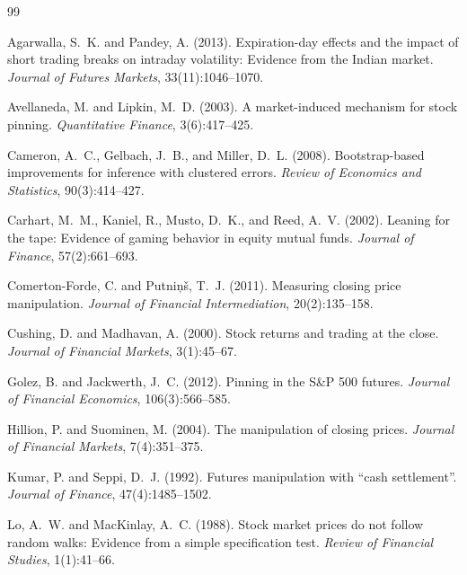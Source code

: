\begin{thebibliography}{99}
\setlength{\itemsep}{2pt}
\small

Agarwalla, S.~K. and Pandey, A. (2013).
\newblock Expiration-day effects and the impact of short trading breaks on intraday
  volatility: Evidence from the Indian market.
\newblock \emph{Journal of Futures Markets}, 33(11):1046--1070.

Avellaneda, M. and Lipkin, M.~D. (2003).
\newblock A market-induced mechanism for stock pinning.
\newblock \emph{Quantitative Finance}, 3(6):417--425.

Cameron, A.~C., Gelbach, J.~B., and Miller, D.~L. (2008).
\newblock Bootstrap-based improvements for inference with clustered errors.
\newblock \emph{Review of Economics and Statistics}, 90(3):414--427.

Carhart, M.~M., Kaniel, R., Musto, D.~K., and Reed, A.~V. (2002).
\newblock Leaning for the tape: Evidence of gaming behavior in equity mutual funds.
\newblock \emph{Journal of Finance}, 57(2):661--693.

Comerton-Forde, C. and Putni{\c{n}}{\v{s}}, T.~J. (2011).
\newblock Measuring closing price manipulation.
\newblock \emph{Journal of Financial Intermediation}, 20(2):135--158.

Cushing, D. and Madhavan, A. (2000).
\newblock Stock returns and trading at the close.
\newblock \emph{Journal of Financial Markets}, 3(1):45--67.

Golez, B. and Jackwerth, J.~C. (2012).
\newblock Pinning in the S\&P 500 futures.
\newblock \emph{Journal of Financial Economics}, 106(3):566--585.

Hillion, P. and Suominen, M. (2004).
\newblock The manipulation of closing prices.
\newblock \emph{Journal of Financial Markets}, 7(4):351--375.

Kumar, P. and Seppi, D.~J. (1992).
\newblock Futures manipulation with ``cash settlement''.
\newblock \emph{Journal of Finance}, 47(4):1485--1502.

Lo, A.~W. and MacKinlay, A.~C. (1988).
\newblock Stock market prices do not follow random walks: Evidence from a simple
  specification test.
\newblock \emph{Review of Financial Studies}, 1(1):41--66.


\end{thebibliography}
